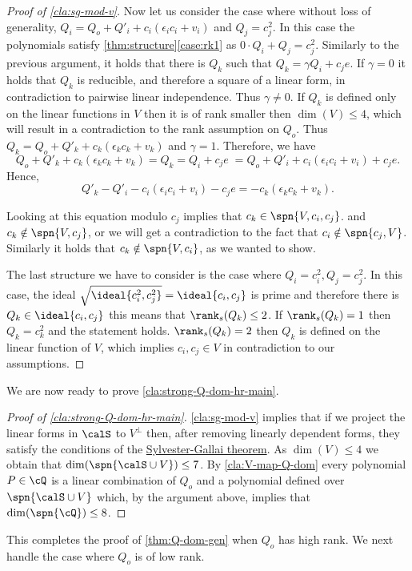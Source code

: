 \begin{proof}[Proof of \autoref{cla:sg-mod-v}]
Now let us consider the case where without loss of generality, $Q_i = Q_o +Q'_i + c_i(\epsilon_i c_i + v_i)$ and $Q_j = c_j^2$. In this case the polynomials satisfy   \autoref{thm:structure}\ref{case:rk1} as $0 \cdot Q_i + Q_j = c_j^2$.
Similarly to the previous argument, it holds that there is $Q_k$ such that $Q_k = \gamma Q_i + c_j e$. If $\gamma =0$ it holds that $Q_k$ is reducible, and therefore a square of a linear form, in contradiction to pairwise linear independence. Thus $\gamma \neq 0$. If $Q_k$ is defined only on the linear functions in $V$ then it is of rank smaller then $\dim(V) \leq 4$, which will result in a contradiction to the rank assumption on $Q_o$. Thus $Q_k = Q_o + Q'_k + c_k(\epsilon_k c_k + v_k)$ and $\gamma = 1$. Therefore, we have 
\[ Q_o + Q'_k + c_k(\epsilon_k c_k + v_k) = Q_k = Q_i + c_j e\; = Q_o + Q'_i + c_i(\epsilon_i c_i + v_i)+ c_j e.\]
Hence,
\[Q'_k - Q'_i -c_i(\epsilon_i c_i + v_i) - c_je= -c_k(\epsilon_k c_k + v_k).\] 

Looking at this equation modulo $c_j$ implies that $c_k \in \spn{V, c_i, c_j}$. and $c_k \notin \spn{V, c_j}$, or we will get a contradiction to the fact that $c_i \notin\spn{c_j ,V}$. Similarly it holds that $c_k \notin \spn{V, c_i}$, as we wanted to show.

The last structure we have to consider is the case where $Q_i = c_i^2, Q_j = c_j^2$. In this case, the ideal $\sqrt{\ideal{c_i^2,c_j^2}} = \ideal{c_i,c_j}$ is prime and therefore there is $Q_k \in \ideal{c_i,c_j}$ this means that $\rank_s(Q_k) \leq 2$. If $\rank_s(Q_k) = 1$ then $Q_k = c_k^2$ and the statement holds. $\rank_s(Q_k) = 2$ then $Q_k$ is defined on the linear function of $V$,  which implies $c_i,c_j \in V$ in contradiction to our assumptions.
\end{proof}
We are now ready to prove \autoref{cla:strong-Q-dom-hr-main}.
\begin{proof}[Proof of \autoref{cla:strong-Q-dom-hr-main}]
\autoref{cla:sg-mod-v} implies that if we project the linear forms in $\calS$ to $V^\perp$ then, after removing linearly dependent forms, they satisfy the conditions of the \hyperref[thm:SG-linforms]{Sylvester-Gallai theorem}. As $\dim(V)\leq 4$ we obtain that $\dim(\spn{\calS\cup V}) \leq 7$. 
By \autoref{cla:V-map-Q-dom} every polynomial $P\in\cQ$ is a linear combination of $Q_o$ and a polynomial defined over $\spn{\calS\cup V}$ which, by the argument above, implies that $\dim(\spn{\cQ})\leq 8$. 
\end{proof}

This completes the proof of  \autoref{thm:Q-dom-gen} when  $Q_o$ has high rank.
We next handle the case where $Q_o$ is of low rank. 

